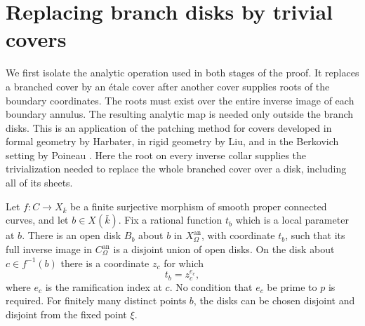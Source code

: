 \section{Replacing branch disks by trivial covers}
\label{sec:patching}

We first isolate the analytic operation used in both stages of the proof.
It replaces a branched cover by an étale cover after another cover supplies
roots of the boundary coordinates.  The roots must exist over the entire
inverse image of each boundary annulus.  The resulting analytic map is
needed only outside the branch disks.
This is an application of the patching method for covers developed in
formal geometry by Harbater, in rigid geometry by Liu, and in the
Berkovich setting by Poineau
\cite{HarbaterPatching,LiuPatching,GAGA}.  Here the root on every inverse
collar supplies the trivialization needed to replace the whole branched
cover over a disk, including all of its sheets.

\begin{lemma}\label{lem:local-normal-form}
Let $f:C\to X_{\bar k}$ be a finite surjective morphism of smooth proper
connected curves, and let $b\in X(\bar k)$.  Fix a rational function $t_b$
which is a local parameter at $b$.  There is an open disk $B_b$ about $b$
in $X_\Omega^{\mathrm{an}}$, with coordinate $t_b$, such that its full
inverse image in $C_\Omega^{\mathrm{an}}$ is a disjoint union of open
disks.  On the disk about $c\in f^{-1}(b)$ there is a coordinate $z_c$
for which
\[
                         t_b=z_c^{e_c},
\]
where $e_c$ is the ramification index at $c$.  No condition that $e_c$ be
prime to $p$ is required.  For finitely many distinct points $b$, the disks
can be chosen disjoint and disjoint from the fixed point $\xi$.
\end{lemma}


